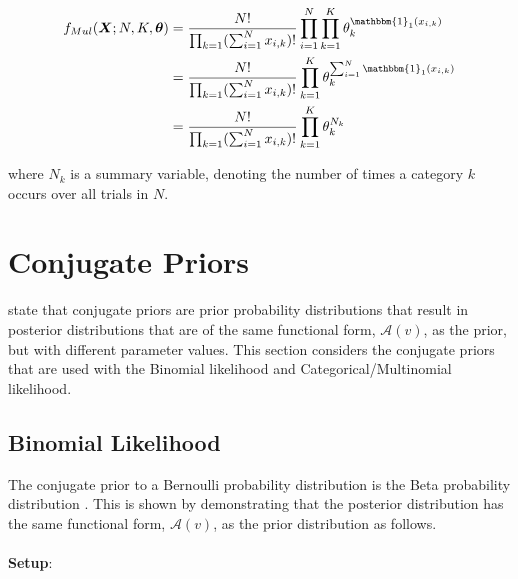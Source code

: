 \begin{equation}
      \label{eq:probability:probability_distributions:multinomial:pmf_alt}
      \begin{split}
            f_{Mul}(\boldsymbol{X}; N, K, \boldsymbol{\theta}) &= \frac{N!}{\prod_{k=1}(\sum_{i=1}^{N}x_{i, k})!}\prod_{i=1}^{N}\prod_{k=1}^{K}\theta_{k}^{\mathbbm{1}_{1}(x_{i,k})} \\
            &= \frac{N!}{\prod_{k=1}(\sum_{i=1}^{N}x_{i, k})!} \prod_{k=1}^{K}\theta_{k}^{\sum_{i=1}^{N}\mathbbm{1}_{1}(x_{i,k})} \\
            &= \frac{N!}{\prod_{k=1}(\sum_{i=1}^{N}x_{i, k})!} \prod_{k=1}^{K}\theta_{k}^{N_{k}} \\
      \end{split}
\end{equation}

where $N_{k}$ is a summary variable, denoting the number of times a category $k$ occurs over all trials in $N$.

\section{Conjugate Priors}\label{sec:probability:conjugate_priors}

\citeauthor{ref:wackerly:2014}\cite{ref:wackerly:2014} state that conjugate priors are prior probability distributions that result in posterior distributions that are of the same functional form, $\mathcal{A}(v)$, as the prior, but with different parameter values. This section considers the conjugate priors that are used with the Binomial likelihood and Categorical/Multinomial likelihood.

\subsection{Binomial Likelihood}\label{sec:probability:conjugate_priors:binom_likelihood}

The conjugate prior to a Bernoulli probability distribution is the Beta probability distribution
\cite{ref:wackerly:2014}. This is shown by demonstrating that the posterior distribution has the
same functional form, $\mathcal{A}(v)$, as the prior distribution as follows. \\\\
\textbf{Setup}:

